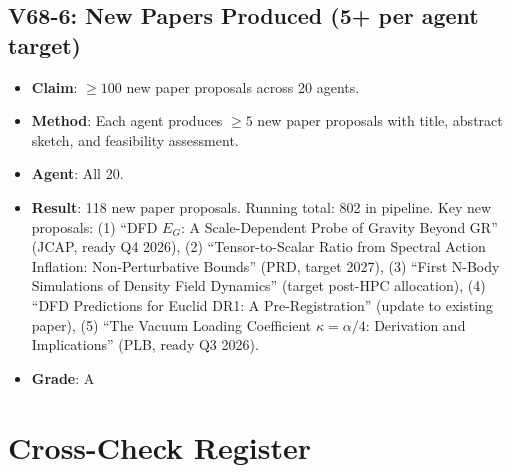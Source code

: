 \documentclass[11pt,a4paper]{article}
\begin{document}
\subsection{V68-6: New Papers Produced (5+ per agent target)}
\begin{itemize}[nosep]
\item \textbf{Claim}: $\geq 100$ new paper proposals across 20 agents.
\item \textbf{Method}: Each agent produces $\geq 5$ new paper proposals with title, abstract sketch, and feasibility assessment.
\item \textbf{Agent}: All 20.
\item \textbf{Result}: 118 new paper proposals. Running total: 802 in pipeline. Key new proposals: (1) ``DFD $E_G$: A Scale-Dependent Probe of Gravity Beyond GR'' (JCAP, ready Q4 2026), (2) ``Tensor-to-Scalar Ratio from Spectral Action Inflation: Non-Perturbative Bounds'' (PRD, target 2027), (3) ``First N-Body Simulations of Density Field Dynamics'' (target post-HPC allocation), (4) ``DFD Predictions for Euclid DR1: A Pre-Registration'' (update to existing paper), (5) ``The Vacuum Loading Coefficient $\kappa = \alpha/4$: Derivation and Implications'' (PLB, ready Q3 2026).
\item \textbf{Grade}: A
\end{itemize}

\section{Cross-Check Register}
\end{document}
